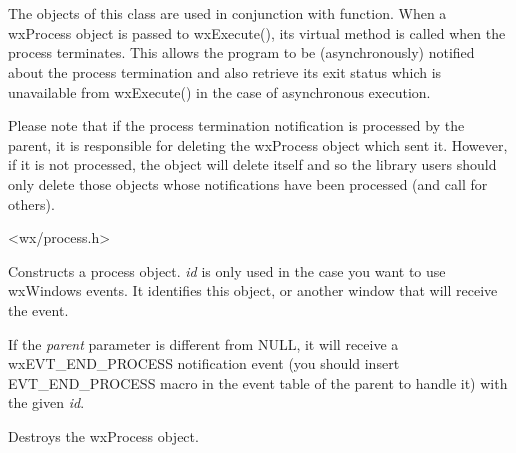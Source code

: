 \section{}\label{wxprocess}

The objects of this class are used in conjunction with 
 function. When a wxProcess object is passed to
wxExecute(), its  virtual method
is called when the process terminates. This allows the program to be
(asynchronously) notified about the process termination and also retrieve its
exit status which is unavailable from wxExecute() in the case of
asynchronous execution.

Please note that if the process termination notification is processed by the
parent, it is responsible for deleting the wxProcess object which sent it.
However, if it is not processed, the object will delete itself and so the
library users should only delete those objects whose notifications have been
processed (and call  for others).




<wx/process.h>


\label{wxprocessconstr}


Constructs a process object. {\it id} is only used in the case you want to
use wxWindows events. It identifies this object, or another window that will
receive the event.

If the {\it parent} parameter is different from NULL, it will receive
a wxEVT\_END\_PROCESS notification event (you should insert EVT\_END\_PROCESS
macro in the event table of the parent to handle it) with the given {\it id}.






Destroys the wxProcess object.

